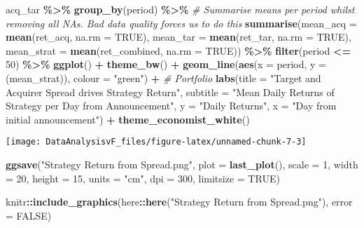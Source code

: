 \documentclass[
]{article}
\newenvironment{Shaded}{\begin{snugshade}}{\end{snugshade}}
\newcommand{\CommentTok}[1]{\textcolor[rgb]{0.56,0.35,0.01}{\textit{#1}}}
\newcommand{\DataTypeTok}[1]{\textcolor[rgb]{0.13,0.29,0.53}{#1}}
\newcommand{\DecValTok}[1]{\textcolor[rgb]{0.00,0.00,0.81}{#1}}
\newcommand{\KeywordTok}[1]{\textcolor[rgb]{0.13,0.29,0.53}{\textbf{#1}}}
\newcommand{\NormalTok}[1]{#1}
\newcommand{\OperatorTok}[1]{\textcolor[rgb]{0.81,0.36,0.00}{\textbf{#1}}}
\newcommand{\OtherTok}[1]{\textcolor[rgb]{0.56,0.35,0.01}{#1}}
\newcommand{\StringTok}[1]{\textcolor[rgb]{0.31,0.60,0.02}{#1}}
\begin{document}
\begin{Shaded}
\begin{Highlighting}[]
\NormalTok{acq\_tar }\OperatorTok{\%\textgreater{}\%}
\StringTok{  }\KeywordTok{group\_by}\NormalTok{(period) }\OperatorTok{\%\textgreater{}\%}
\StringTok{  }\CommentTok{\# Summarise means per period whilst removing all NAs. Bad data quality forces us to do this}
\StringTok{  }\KeywordTok{summarise}\NormalTok{(}\DataTypeTok{mean\_acq =} \KeywordTok{mean}\NormalTok{(ret\_acq, }\DataTypeTok{na.rm =} \OtherTok{TRUE}\NormalTok{),}
            \DataTypeTok{mean\_tar =} \KeywordTok{mean}\NormalTok{(ret\_tar, }\DataTypeTok{na.rm =} \OtherTok{TRUE}\NormalTok{),}
            \DataTypeTok{mean\_strat =} \KeywordTok{mean}\NormalTok{(ret\_combined, }\DataTypeTok{na.rm =} \OtherTok{TRUE}\NormalTok{)) }\OperatorTok{\%\textgreater{}\%}
\StringTok{  }\KeywordTok{filter}\NormalTok{(period }\OperatorTok{\textless{}=}\StringTok{ }\DecValTok{50}\NormalTok{) }\OperatorTok{\%\textgreater{}\%}
\StringTok{  }\KeywordTok{ggplot}\NormalTok{() }\OperatorTok{+}
\StringTok{  }\KeywordTok{theme\_bw}\NormalTok{() }\OperatorTok{+}
\StringTok{  }\KeywordTok{geom\_line}\NormalTok{(}\KeywordTok{aes}\NormalTok{(}\DataTypeTok{x =}\NormalTok{ period, }\DataTypeTok{y =}\NormalTok{ (mean\_strat)), }\DataTypeTok{colour =} \StringTok{"green"}\NormalTok{) }\OperatorTok{+}\StringTok{ }\CommentTok{\# Portfolio }
\StringTok{  }\KeywordTok{labs}\NormalTok{(}\DataTypeTok{title =} \StringTok{"Target and Acquirer Spread drives Strategy Return"}\NormalTok{,}
       \DataTypeTok{subtitle =} \StringTok{"Mean Daily Returns of Strategy per Day from Announcement"}\NormalTok{,}
       \DataTypeTok{y =} \StringTok{"Daily Returns"}\NormalTok{,}
       \DataTypeTok{x =} \StringTok{"Day from initial announcement"}\NormalTok{) }\OperatorTok{+}\StringTok{ }
\StringTok{  }\KeywordTok{theme\_economist\_white}\NormalTok{()}
\end{Highlighting}
\end{Shaded}

\begin{center}\texttt{[image: DataAnalysisvF\_files/figure-latex/unnamed-chunk-7-3]} \end{center}

\begin{Shaded}
\begin{Highlighting}[]
\KeywordTok{ggsave}\NormalTok{(}\StringTok{"Strategy Return from Spread.png"}\NormalTok{,}
       \DataTypeTok{plot =} \KeywordTok{last\_plot}\NormalTok{(),}
       \DataTypeTok{scale =} \DecValTok{1}\NormalTok{,}
       \DataTypeTok{width =} \DecValTok{20}\NormalTok{,}
       \DataTypeTok{height =} \DecValTok{15}\NormalTok{,}
       \DataTypeTok{units =} \StringTok{"cm"}\NormalTok{,}
       \DataTypeTok{dpi =} \DecValTok{300}\NormalTok{,}
       \DataTypeTok{limitsize =} \OtherTok{TRUE}\NormalTok{)}

\NormalTok{knitr}\OperatorTok{::}\KeywordTok{include\_graphics}\NormalTok{(here}\OperatorTok{::}\KeywordTok{here}\NormalTok{(}\StringTok{"Strategy Return from Spread.png"}\NormalTok{), }\DataTypeTok{error =} \OtherTok{FALSE}\NormalTok{)}
\end{Highlighting}
\end{Shaded}
\end{document}

